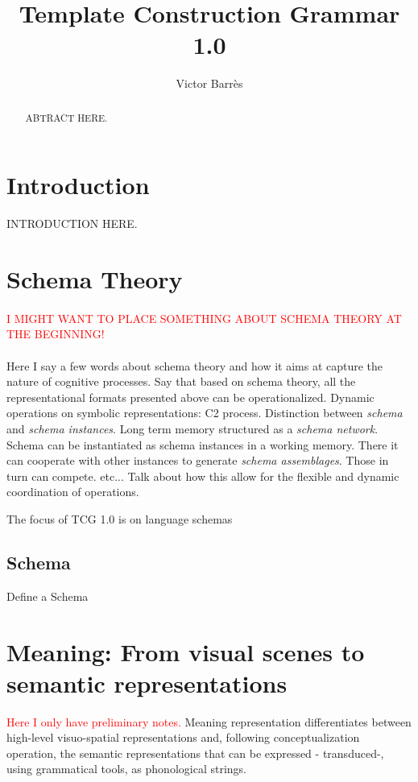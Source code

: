 \documentclass{article}
\newcommand\todo[1]{\textcolor{red}{#1}}
\begin{document}
\title{Template Construction Grammar 1.0}
\author{Victor Barr\`es}

\maketitle

\begin{abstract}
ABTRACT HERE.

\end{abstract}

\section{Introduction}
INTRODUCTION HERE.

\section{Schema Theory}

\paragraph{}
\todo{I MIGHT WANT TO PLACE SOMETHING ABOUT SCHEMA THEORY AT THE BEGINNING!}

\paragraph{}
Here I say a few words about schema theory and how it aims at capture the nature of cognitive processes.
Say that based on schema theory, all the representational formats presented above can be operationalized.
Dynamic operations on symbolic representations: C2 process.
Distinction between \emph{schema} and \emph{schema instances}.
Long term memory structured as a \emph{schema network}.
Schema can be instantiated as schema instances in a working memory. There it can cooperate with other instances to generate \emph{schema assemblages}. Those in turn can compete. etc...
Talk about how this allow for the flexible and dynamic coordination of operations.

The focus of TCG 1.0 is on language schemas

\subsection{Schema}
Define a Schema

\section{Meaning: From visual scenes to semantic representations}
\todo{Here I only have preliminary notes.}
Meaning representation differentiates between high-level visuo-spatial representations and, following conceptualization operation, the semantic representations that can be expressed - transduced-, using grammatical tools, as phonological strings.
\end{document}
